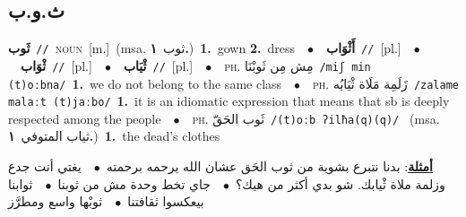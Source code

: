 \documentclass[10pt,a4paper,twoside]{article} %
\begin{document}
\begin{multicols}{2}
\vspace{-3mm}
\subsection*{\color{blue}\foreignlanguage{arabic}{ث.و.ب}\color{blue}{}} 

{\setlength\topsep{0pt}\textbf{\foreignlanguage{arabic}{ثَوب}}\ {\color{gray}\texttt{//}\color{black}}\ \textsc{noun}\ [m.]\ \color{gray}(msa. \foreignlanguage{arabic}{ثوب}~\foreignlanguage{arabic}{\textbf{١.}})\color{black}\ \textbf{1.}~gown  \textbf{2.}~dress\ \ $\bullet$\ \ \setlength\topsep{0pt}\textbf{\foreignlanguage{arabic}{أَثْوَاب}}\ {\color{gray}\texttt{//}\color{black}}\ [pl.]\ \ $\bullet$\ \ \setlength\topsep{0pt}\textbf{\foreignlanguage{arabic}{ثْوَاب}}\ {\color{gray}\texttt{//}\color{black}}\ [pl.]\ \ $\bullet$\ \ \setlength\topsep{0pt}\textbf{\foreignlanguage{arabic}{ثْيَاب}}\ {\color{gray}\texttt{//}\color{black}}\ [pl.]\ \ $\bullet$\ \ \textsc{ph.} \color{gray} \foreignlanguage{arabic}{مِش مِن ثَوبْنَا}\color{black}\ {\color{gray}\texttt{/{\sffamily miʃ min (t)oːbna}/}\color{black}}\ \textbf{1.}~we do not belong to the same class\ \ $\bullet$\ \ \textsc{ph.} \color{gray} \foreignlanguage{arabic}{زَلَمِة مَلَاة ثْيَابُه}\color{black}\ {\color{gray}\texttt{/{\sffamily zalame malaːt (t)jaːbo}/}\color{black}}\ \textbf{1.}~it is an idiomatic expression that means that sb is deeply respected among the people\ \ $\bullet$\ \ \textsc{ph.} \color{gray} \foreignlanguage{arabic}{ثَوب الحَقّ}\color{black}\ {\color{gray}\texttt{/{\sffamily (t)oːb ʔilħa(q)(q)}/}\color{black}}\ \color{gray} (msa. \foreignlanguage{arabic}{ثياب المتوفي}~\foreignlanguage{arabic}{\textbf{١.}})\color{black}\ \textbf{1.}~the dead's clothes\  \begin{flushright}\color{gray}\foreignlanguage{arabic}{\textbf{\underline{\foreignlanguage{arabic}{أمثلة}}}: بدنا نتبرع بشوية من ثوب الحَق عشان الله يرحمه برحمته\ $\bullet$\ \  يغتي أنت جدع وزلمة ملاة ثْيابك. شو بدي أكثر من هيك؟\ $\bullet$\ \  جاي تخط وحدة مش من ثوبنا\ $\bullet$\ \  ثوابنا بيعكسوا ثقافتنا\ $\bullet$\ \  ثوبْها واسع ومطرَّز}\end{flushright}\color{black}} \vspace{2mm}


\end{multicols}
\end{document}
